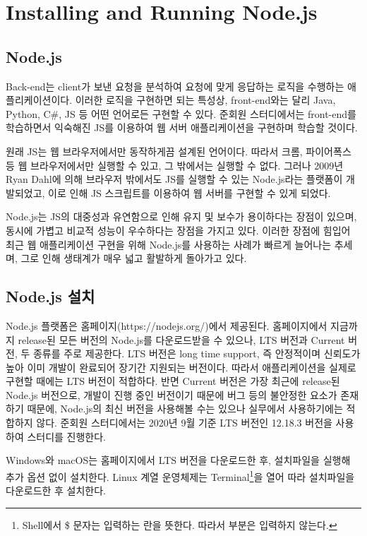 \section{Installing and Running Node.js}\label{sect:installing-and-running-node-js}

\subsection*{Node.js}

Back-end는 client가 보낸 요청을 분석하여 요청에 맞게 응답하는 로직을 수행하는 애플리케이션이다. 이러한 로직을 구현하면 되는 특성상, front-end와는 달리 Java, Python, C\#, JS 등 어떤 언어로든 구현할 수 있다. 준회원 스터디에서는 front-end를 학습하면서 익숙해진 JS를 이용하여 웹 서버 애플리케이션을 구현하며 학습할 것이다.

원래 JS는 웹 브라우저에서만 동작하게끔 설계된 언어이다. 따라서 크롬, 파이어폭스 등 웹 브라우저에서만 실행할 수 있고, 그 밖에서는 실행할 수 없다. 그러나 2009년 Ryan Dahl에 의해 브라우저 밖에서도 JS를 실행할 수 있는 Node.js라는 플랫폼이 개발되었고, 이로 인해 JS 스크립트를 이용하여 웹 서버를 구현할 수 있게 되었다.

Node.js는 JS의 대중성과 유연함으로 인해 유지 및 보수가 용이하다는 장점이 있으며, 동시에 가볍고 비교적 성능이 우수하다는 장점을 가지고 있다. 이러한 장점에 힘입어 최근 웹 애플리케이션 구현을 위해 Node.js를 사용하는 사례가 빠르게 늘어나는 추세며, 그로 인해 생태계가 매우 넓고 활발하게 돌아가고 있다.

\subsection*{Node.js 설치}

Node.js 플랫폼은 홈페이지(https://nodejs.org/)에서 제공된다. 홈페이지에서 지금까지 release된 모든 버전의 Node.js를 다운로드받을 수 있으나, LTS 버전과 Current 버전, 두 종류를 주로 제공한다. LTS 버전은 long time support, 즉 안정적이며 신뢰도가 높아 이미 개발이 완료되어 장기간 지원되는 버전이다. 따라서 애플리케이션을 실제로 구현할 때에는 LTS 버전이 적합하다. 반면 Current 버전은 가장 최근에 release된 Node.js 버전으로, 개발이 진행 중인 버전이기 때문에 버그 등의 불안정한 요소가 존재하기 때문에, Node.js의 최신 버전을 사용해볼 수는 있으나 실무에서 사용하기에는 적합하지 않다. 준회원 스터디에서는 2020년 9월 기준 LTS 버전인 12.18.3 버전을 사용하여 스터디를 진행한다.

Windows와 macOS는 홈페이지에서 LTS 버전을 다운로드한 후, 설치파일을 실행해 추가 옵션 없이 설치한다. Linux 계열 운영체제는 Terminal\footnote{Shell에서 \$ 문자는 입력하는 란을 뜻한다. 따라서 \cd{\$ } 부분은 입력하지 않는다.}을 열어 \을 따라 설치파일을 다운로드한 후 설치한다.

